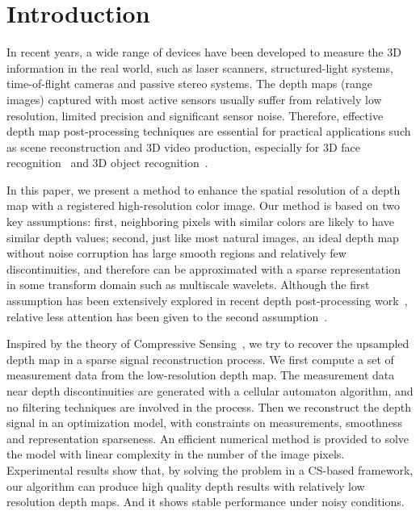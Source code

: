 \documentclass[preprint,10pt,5p,times,twocolumn]{elsarticle}
\begin{document}

\section{Introduction}
\label{chap:intro}

In recent years, a wide range of devices have been developed to measure the 3D information in the real world, such as laser scanners, structured-light systems, time-of-flight cameras and passive stereo systems. The depth maps (range images) captured with most active sensors usually suffer from relatively low resolution, limited precision and significant sensor noise. Therefore, effective depth map post-processing techniques are essential for practical applications such as scene reconstruction and 3D video production, especially for 3D face recognition~\cite{LeiBHG14} and 3D object recognition~\cite{Emanuele2013,Guo2013}.

In this paper, we present a method to enhance the spatial resolution of a depth map with a registered high-resolution color image. Our method is based on two key assumptions: first, neighboring pixels with similar colors are likely to have similar depth values; second, just like most natural images, an ideal depth map without noise corruption has large smooth regions and relatively few discontinuities, and therefore can be approximated with a sparse representation in some transform domain such as multiscale wavelets. Although the first assumption has been extensively explored in recent depth post-processing work~\cite{DT05,KCLU07,YYDN07,CBTT08,HSJS10,PKTBK11}, relative less attention has been given to the second assumption~\cite{TOC11,HKD11}.

Inspired by the theory of Compressive Sensing~\cite{CRT06,Donoho06}, we try to recover the upsampled depth map in a sparse signal reconstruction process. We first compute a set of measurement data from the low-resolution depth map. The measurement data near depth discontinuities are generated with a cellular automaton algorithm, and no filtering techniques are involved in the process. Then we reconstruct the depth signal in an optimization model, with constraints on measurements, smoothness and representation sparseness. An efficient numerical method is provided to solve the model with linear complexity in the number of the image pixels. Experimental results show that, by solving the problem in a CS-based framework, our algorithm can produce high quality depth results with relatively low resolution depth maps. And it shows stable performance under noisy conditions.
\end{document}
